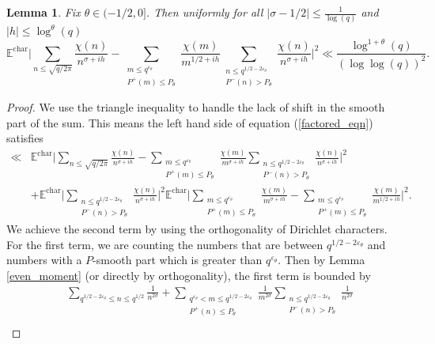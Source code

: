 \documentclass[reqno]{amsart}
\newtheorem{lemma}{Lemma}
\theoremstyle{definition}
\theoremstyle{remark}
\numberwithin{equation}{section}
\theoremstyle{remark}
\begin{document}
\begin{lemma}
    Fix $\theta \in (-1/2,0]$. Then uniformly for all $|\sigma-1/2| \leq \frac{1}{\log(q)}$ and $|h| \leq \log^{\theta}(q)$
    \begin{equation}
        \mathbb{E}^{\text{char}}\big|\sum_{n \leq \sqrt{q/2\pi}}\frac{\chi(n)}{n^{\sigma+ih}}-\sum_{\substack{m \leq q^{\varepsilon_\theta} \\ P^+(m) \leq P_\theta}}\frac{\chi(m)}{m^{1/2+ih}}\sum_{\substack{n \leq q^{1/2-2\varepsilon_\theta} \\ P^-(n) > P_\theta}}\frac{\chi(n)}{n^{\sigma+ih}}\big|^2 \ll \frac{\log^{1+\theta}(q)}{(\log\log(q))^2}.  \label{factored_eqn}
    \end{equation} \label{factored_form}
\end{lemma}
\begin{proof}
    We use the triangle inequality to handle the lack of shift in the smooth part of the sum. This means the left hand side of equation (\ref{factored_eqn}) satisfies
    \begin{align*}
        \ll& \mathbb{E}^{\text{char}}\big|\sum_{n \leq \sqrt{q/2\pi}}\frac{\chi(n)}{n^{\sigma+ih}}-\sum_{\substack{m \leq q^{\varepsilon_\theta} \\ P^+(m) \leq P_\theta}}\frac{\chi(m)}{m^{\sigma+ih}}\sum_{\substack{n \leq q^{1/2-2\varepsilon_\theta} \\ P^-(n) > P_\theta}}\frac{\chi(n)}{n^{\sigma+ih}}\big|^2 \\
        &+ \mathbb{E}^{\text{char}}\big|\sum_{\substack{n \leq q^{1/2-2\varepsilon_\theta} \\ P^-(n) > P_\theta}}\frac{\chi(n)}{n^{\sigma+ih}}\big|^2\mathbb{E}^{\text{char}}\big|\sum_{\substack{m \leq q^{\varepsilon_\theta} \\ P^+(m) \leq P_\theta}}\frac{\chi(m)}{m^{\sigma+ih}}-\sum_{\substack{m \leq q^{\varepsilon_\theta} \\ P^+(m) \leq P_\theta}}\frac{\chi(m)}{m^{1/2+ih}}\big|^2.
    \end{align*}
    We achieve the second term by using the orthogonality of Dirichlet characters. For the first term, we are counting the numbers that are between $q^{1/2-2\varepsilon_\theta}$ and numbers with a $P$-smooth part which is greater than $q^{\varepsilon_\theta}$. Then by Lemma \ref{even_moment} (or directly by orthogonality), the first term is bounded by
    \begin{align*}
        &\sum_{q^{1/2-2\varepsilon_\theta} \leq n \leq q^{1/2}}  \frac{1}{n^{2\sigma}}+\sum_{\substack{q^{\varepsilon_\theta}< m \leq q^{1/2-2\varepsilon_\theta} \\ P^+(n) \leq P_\theta}}\frac{1}{m^{2\sigma}}\sum_{\substack{n \leq q^{1/2-2\varepsilon_\theta} \\ P^-(n) > P_\theta}}\frac{1}{n^{2\sigma}} \\

\end{align*}
\end{proof}
\end{document}
